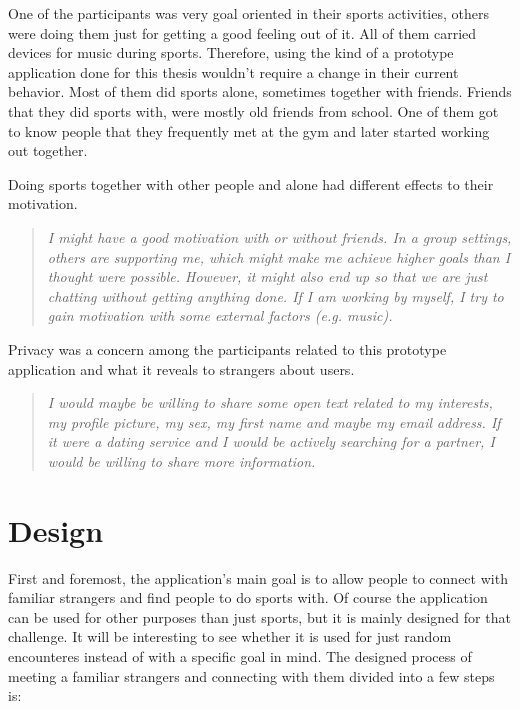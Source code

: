 One of the participants was very goal oriented in their sports activities, others were doing them just for getting a good feeling out of it. All of them carried devices for music during sports. Therefore, using the kind of a prototype application done for this thesis wouldn't require a change in their current behavior. Most of them did sports alone, sometimes together with friends. Friends that they did sports with, were mostly old friends from school. One of them got to know people that they frequently met at the gym and later started working out together.

Doing sports together with other people and alone had different effects to their motivation.

\begin{quote}
\it I might have a good motivation with or without friends. In a group settings, others are supporting me, which might make me achieve higher goals than I thought were possible. However, it might also end up so that we are just chatting without getting anything done. If I am working by myself, I try to gain motivation with some external factors (e.g. music).
\end{quote}

Privacy was a concern among the participants related to this prototype application and what it reveals to strangers about users.

\begin{quote}
\it I would maybe be willing to share some open text related to my interests, my profile picture, my sex, my first name and maybe my email address. If it were a dating service and I would be actively searching for a partner, I would be willing to share more information.
\end{quote}


\section{Design}

First and foremost, the application's main goal is to allow people to connect with familiar strangers and find people to do sports with. Of course the application can be used for other purposes than just sports, but it is mainly designed for that challenge. It will be interesting to see whether it is used for just random encounteres instead of with a specific goal in mind. The designed process of meeting a familiar strangers and connecting with them divided into a few steps is:

